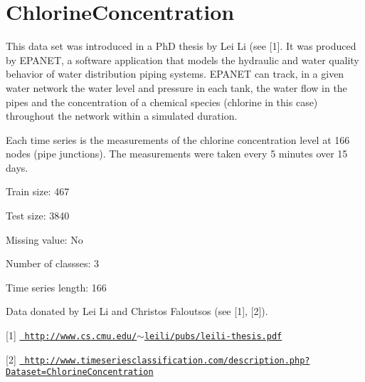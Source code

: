 \chapter{Chlorine\+Concentration}
\hypertarget{md_external_2data_2UCRArchive__2018_2ChlorineConcentration_2README}{}\label{md_external_2data_2UCRArchive__2018_2ChlorineConcentration_2README}
\label{md_external_2data_2UCRArchive__2018_2ChlorineConcentration_2README_autotoc_md33}%
%
 This data set was introduced in a PhD thesis by Lei Li (see \mbox{[}1\mbox{]}. It was produced by EPANET, a software application that models the hydraulic and water quality behavior of water distribution piping systems. EPANET can track, in a given water network the water level and pressure in each tank, the water flow in the pipes and the concentration of a chemical species (chlorine in this case) throughout the network within a simulated duration.

Each time series is the measurements of the chlorine concentration level at 166 nodes (pipe junctions). The measurements were taken every 5 minutes over 15 days.

Train size\+: 467

Test size\+: 3840

Missing value\+: No

Number of classses\+: 3

Time series length\+: 166

Data donated by Lei Li and Christos Faloutsos (see \mbox{[}1\mbox{]}, \mbox{[}2\mbox{]}).

\mbox{[}1\mbox{]} \href{http://www.cs.cmu.edu/~leili/pubs/leili-thesis.pdf}{\texttt{ http\+://www.\+cs.\+cmu.\+edu/\texorpdfstring{$\sim$}{\string~}leili/pubs/leili-\/thesis.\+pdf}}

\mbox{[}2\mbox{]} \href{http://www.timeseriesclassification.com/description.php?Dataset=ChlorineConcentration}{\texttt{ http\+://www.\+timeseriesclassification.\+com/description.\+php?\+Dataset=\+Chlorine\+Concentration}} 